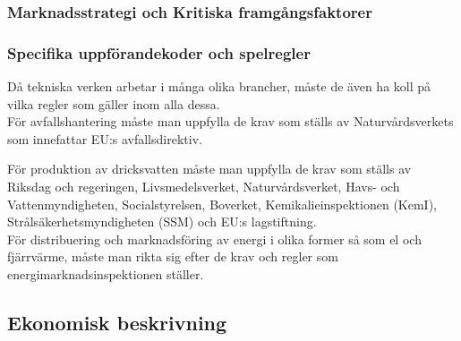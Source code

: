 \documentclass[10pt,a4paper]{article}
\begin{document}
\subsubsection{Marknadsstrategi och Kritiska framgångsfaktorer}


\subsubsection{Specifika uppförandekoder och spelregler}
Då tekniska verken arbetar i många olika brancher, måste de även ha koll på vilka regler som gäller inom alla dessa. \\

För avfallshantering måste man uppfylla de krav som ställs av Naturvårdsverkets som innefattar EU:s avfallsdirektiv. 

För produktion av dricksvatten måste man uppfylla de krav som ställs av Riksdag och regeringen, Livsmedelsverket, Naturvårdsverket, Havs- och Vattenmyndigheten, Socialstyrelsen, Boverket, Kemikalieinspektionen (KemI), Strålsäkerhetsmyndigheten (SSM) och EU:s lagstiftning.\\

För distribuering och marknadsföring av energi i olika former så som el och fjärrvärme, måste man rikta sig efter de krav och regler som energimarknadsinspektionen ställer.


\subsection{Ekonomisk beskrivning}
\end{document}
